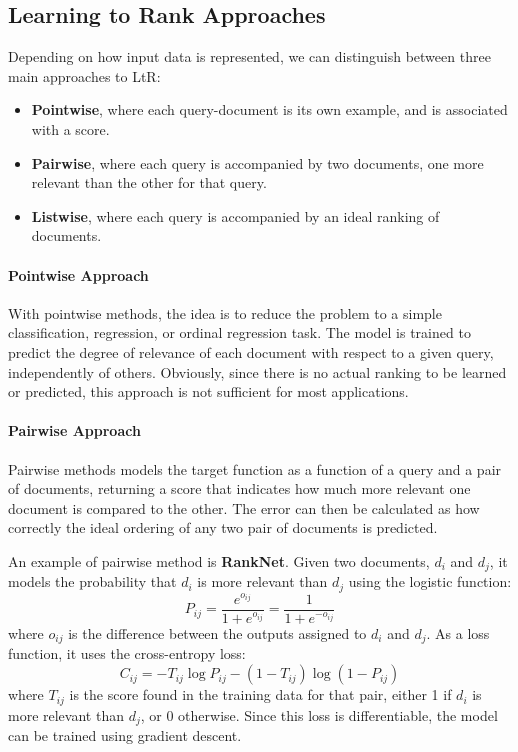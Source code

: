 \subsection{Learning to Rank Approaches}

Depending on how input data is represented, we can distinguish between three main approaches to LtR:
\begin{itemize}
    \item \textbf{Pointwise}, where each query-document is its own example, and is associated with a score.
    \item \textbf{Pairwise}, where each query is accompanied by two documents, one more relevant than the other for that query.
    \item \textbf{Listwise}, where each query is accompanied by an ideal ranking of documents.
\end{itemize}

\paragraph{Pointwise Approach}
With pointwise methods, the idea is to reduce the problem to a simple classification,  regression, or ordinal regression task. The model is trained to predict the degree of relevance of each document with respect to a given query, independently of others. Obviously, since there is no actual ranking to be learned or predicted, this approach is not sufficient for most applications.

\paragraph{Pairwise Approach}
Pairwise methods models the target function as a function of a query and a pair of documents, returning a score that indicates how much more relevant one document is compared to the other. The error can then be calculated as how correctly the ideal ordering of any two pair of documents is predicted.

An example of pairwise method is \textbf{RankNet}. Given two documents, $d_i$ and $d_j$, it models the probability that $d_i$ is more relevant than $d_j$ using the logistic function:
\begin{equation*}
    P_{ij} = \frac{e^{o_{ij}}}{1 + e^{o_{ij}}} = \frac{1}{1 + e^{-o_{ij}}}
\end{equation*}
where $o_{ij}$ is the difference between the outputs assigned to $d_i$ and $d_j$. As a loss function, it uses the cross-entropy loss:
\begin{equation*}
    C_{ij} = - T_{ij} \log P_{ij} - (1 - T_{ij}) \log (1 - P_{ij})
\end{equation*}
where $T_{ij}$ is the score found in the training data for that pair, either 1 if $d_i$ is more relevant than $d_j$, or 0 otherwise. Since this loss is differentiable, the model can be trained using gradient descent.

